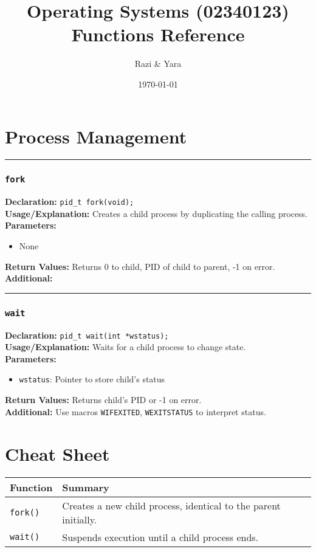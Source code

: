 \documentclass[12pt]{article}
\title{Operating Systems (02340123)\\ Functions Reference}
\author{Razi \& Yara}
\date{\today}
\newcommand{\functionentry}[6]{%
  \noindent\rule{\linewidth}{0.5pt}
  \subsubsection*{\texttt{#1}}
  \textbf{Declaration:} \texttt{#2} \\
  \textbf{Usage/Explanation:} #3 \\
  \textbf{Parameters:}
  \begin{itemize}[leftmargin=*]
    #4
  \end{itemize}
  \textbf{Return Values:} #5 \\
  \textbf{Additional:} #6
  \vspace{1em}
}
\begin{document}
\maketitle
\tableofcontents
\newpage

\section{Process Management}

\functionentry{fork}
{pid\_t fork(void);}
{Creates a child process by duplicating the calling process.}
{\item None}
{Returns 0 to child, PID of child to parent, -1 on error.}
{\label{fork}}

\functionentry{wait}
{pid\_t wait(int *wstatus);}
{Waits for a child process to change state.}
{\item \texttt{wstatus}: Pointer to store child's status}
{Returns child's PID or -1 on error.}
{Use macros \texttt{WIFEXITED}, \texttt{WEXITSTATUS} to interpret status.\label{func:wait}}


\newpage
\section*{Cheat Sheet}
\begin{longtable}{|l|p{11cm}|}
    \hline
    \textbf{Function} & \textbf{Summary}                                                \\
    \hline
    \texttt{fork()}   & Creates a new child process, identical to the parent initially. \\
    \texttt{wait()}   & Suspends execution until a child process ends.                  \\
    \hline
\end{longtable}
\end{document}
